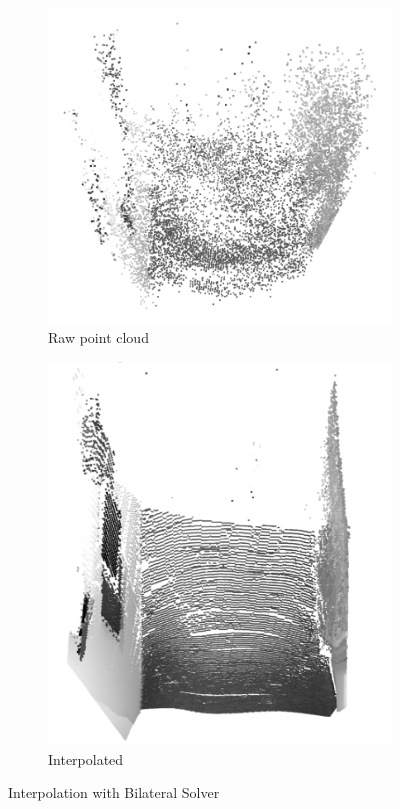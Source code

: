 \begin{figure}[ht!]

    \centering
    \begin{subfigure}[b]{0.4\textwidth}
        \centering
        \includegraphics[width=\linewidth]{images/DepthFromMotionBilateral1}
        \caption{Raw point cloud}
    \end{subfigure}%
    \begin{subfigure}[b]{0.4\textwidth}
        \centering
        \includegraphics[width=\linewidth]{images/DepthFromMotionBilateral2}
        \caption{Interpolated}
    \end{subfigure}%
    \caption{Interpolation with Bilateral Solver}
\end{figure}

